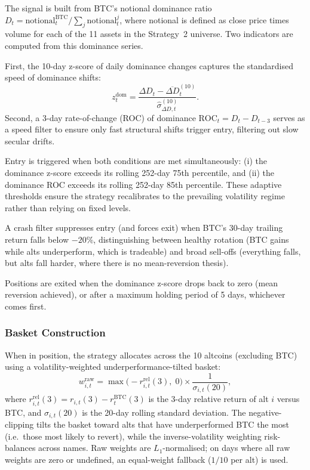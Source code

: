 \documentclass[11pt,a4paper]{article}
\begin{document}
The signal is built from BTC's notional dominance ratio $D_t = \text{notional}^{\text{BTC}}_t / \sum_{j} \text{notional}^j_t$, where notional is defined as close price times volume for each of the 11 assets in the Strategy~2 universe.  Two indicators are computed from this dominance series.

First, the 10-day z-score of daily dominance changes captures the standardised speed of dominance shifts:
\begin{equation}
  z^{\text{dom}}_t = \frac{\Delta D_t - \overline{\Delta D}_t^{(10)}}{\hat{\sigma}^{(10)}_{\Delta D,t}}.
  \label{eq:dom-zscore}
\end{equation}
Second, a 3-day rate-of-change (ROC) of dominance $\text{ROC}_t = D_t - D_{t-3}$ serves as a speed filter to ensure only fast structural shifts trigger entry, filtering out slow secular drifts.

Entry is triggered when both conditions are met simultaneously: (i) the dominance z-score exceeds its rolling 252-day 75th percentile, and (ii) the dominance ROC exceeds its rolling 252-day 85th percentile.  These adaptive thresholds ensure the strategy recalibrates to the prevailing volatility regime rather than relying on fixed levels.

A crash filter suppresses entry (and forces exit) when BTC's 30-day trailing return falls below $-20\%$, distinguishing between healthy rotation (BTC gains while alts underperform, which is tradeable) and broad sell-offs (everything falls, but alts fall harder, where there is no mean-reversion thesis).

Positions are exited when the dominance z-score drops back to zero (mean reversion achieved), or after a maximum holding period of 5 days, whichever comes first.

\subsubsection{Basket Construction}

When in position, the strategy allocates across the 10 altcoins (excluding BTC) using a volatility-weighted underperformance-tilted basket:
\begin{equation}
  w^{\text{raw}}_{i,t} = \max\bigl(-r^{\text{rel}}_{i,t}(3),\; 0\bigr) \times \frac{1}{\sigma_{i,t}(20)},
  \label{eq:basket-weight}
\end{equation}
where $r^{\text{rel}}_{i,t}(3) = r_{i,t}(3) - r^{\text{BTC}}_{t}(3)$ is the 3-day relative return of alt $i$ versus BTC, and $\sigma_{i,t}(20)$ is the 20-day rolling standard deviation.  The negative-clipping tilts the basket toward alts that have underperformed BTC the most (i.e.\ those most likely to revert), while the inverse-volatility weighting risk-balances across names.  Raw weights are $L_1$-normalised; on days where all raw weights are zero or undefined, an equal-weight fallback ($1/10$ per alt) is used.
\end{document}
